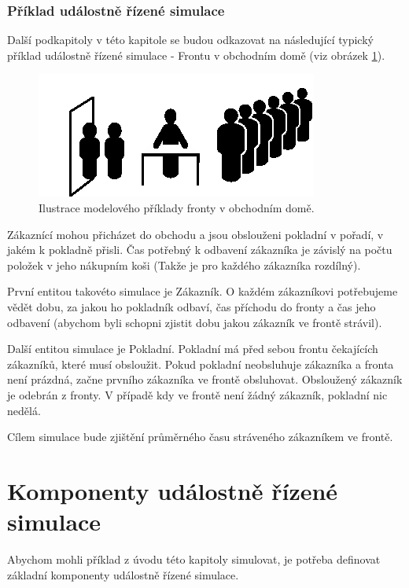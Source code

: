 \subsubsection{Příklad událostně řízené simulace}

Další podkapitoly v této kapitole se budou odkazovat na následující typický příklad událostně řízené simulace - Frontu v obchodním domě (viz obrázek \ref{fig:bank}).

\begin{figure}[ht]
\centering
\includegraphics[trim=0cm 0cm 0cm 0cm]{fig/bank}
\caption{Ilustrace modelového příklady fronty v obchodním domě.}
\label{fig:bank}
\end{figure}

Zákaznící mohou přicházet do obchodu a jsou obslouženi pokladní v pořadí, v jakém k pokladně přisli. Čas potřebný k odbavení zákazníka je závislý na počtu položek v jeho nákupním koši (Takže je pro každého zákazníka rozdílný).

První entitou takovéto simulace je Zákazník. O každém zákazníkovi potřebujeme vědět dobu, za jakou ho pokladník odbaví, čas příchodu do fronty a čas jeho odbavení (abychom byli schopni zjistit dobu jakou zákazník ve frontě strávil).

Další entitou simulace je Pokladní. Pokladní má před sebou frontu čekajících zákazníků, které musí obsloužit. Pokud pokladní neobsluhuje zákazníka a fronta není prázdná, začne prvního zákazníka ve frontě obsluhovat. Obsloužený zákazník je odebrán z fronty. V případě kdy ve frontě není žádný zákazník, pokladní nic nedělá.

Cílem simulace bude zjištění průměrného času stráveného zákazníkem ve frontě.

\section{Komponenty událostně řízené simulace}

Abychom mohli příklad z úvodu této kapitoly simulovat, je potřeba definovat základní komponenty událostně řízené simulace.

